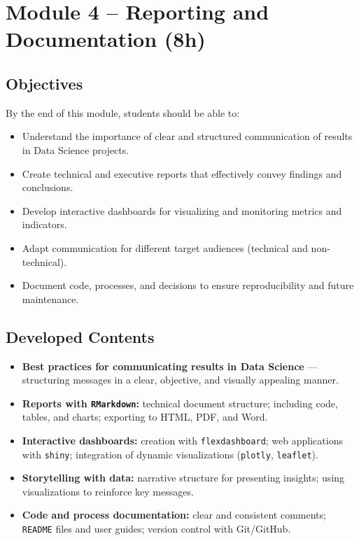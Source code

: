 \section{\textcolor{sectionred}{Module 4 – Reporting and Documentation (8h)}}

\subsection{\textcolor{subsectionblue}{Objectives}}
By the end of this module, students should be able to:
\begin{itemize}
  \item Understand the importance of clear and structured communication of results in Data Science projects.  
  \item Create technical and executive reports that effectively convey findings and conclusions.  
  \item Develop interactive dashboards for visualizing and monitoring metrics and indicators.  
  \item Adapt communication for different target audiences (technical and non-technical).  
  \item Document code, processes, and decisions to ensure reproducibility and future maintenance.
\end{itemize}

\subsection{\textcolor{subsectionblue}{Developed Contents}}
\begin{itemize}
  \item \textbf{Best practices for communicating results in Data Science} — structuring messages in a clear, objective, and visually appealing manner.
  \item \textbf{Reports with \texttt{RMarkdown}:} technical document structure; including code, tables, and charts; exporting to HTML, PDF, and Word.
  \item \textbf{Interactive dashboards:} creation with \texttt{flexdashboard}; web applications with \texttt{shiny}; integration of dynamic visualizations (\texttt{plotly}, \texttt{leaflet}).
  \item \textbf{Storytelling with data:} narrative structure for presenting insights; using visualizations to reinforce key messages.
  \item \textbf{Code and process documentation:} clear and consistent comments; \texttt{README} files and user guides; version control with Git/GitHub.
\end{itemize}

